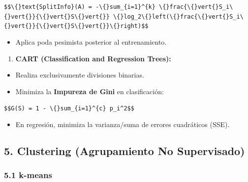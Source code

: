 \documentclass[11pt,oneside]{article}
\begin{document}
\texttt{\$\$\textbackslash\{\}text\{SplitInfo\}(A) = -\textbackslash\{\}sum\_\{i=1\}\textasciicircum{}\{k\} \textbackslash\{\}frac\{\textbackslash\{\}vert\{\}S\_i\textbackslash\{\}vert\{\}\}\{\textbackslash\{\}vert\{\}S\textbackslash\{\}vert\{\}\} \textbackslash\{\}log\_2\textbackslash\{\}left(\textbackslash\{\}frac\{\textbackslash\{\}vert\{\}S\_i\textbackslash\{\}vert\{\}\}\{\textbackslash\{\}vert\{\}S\textbackslash\{\}vert\{\}\}\textbackslash\{\}right)\$\$}\\

\begin{itemize}

\item Aplica poda pesimista posterior al entrenamiento.

\end{itemize}

\begin{enumerate}

\item \textbf{CART (Classification and Regression Trees):}

\end{enumerate}

\begin{itemize}

\item Realiza exclusivamente divisiones binarias.

\item Minimiza la \textbf{Impureza de Gini} en clasificación:

\end{itemize}

\texttt{\$\$G(S) = 1 - \textbackslash\{\}sum\_\{i=1\}\textasciicircum{}\{c\} p\_i\textasciicircum{}2\$\$}\\

\begin{itemize}

\item En regresión, minimiza la varianza/suma de errores cuadráticos (SSE).

\end{itemize}

\subsection{5. Clustering (Agrupamiento No Supervisado)}

\subsubsection{5.1 k-means}
\end{document}
